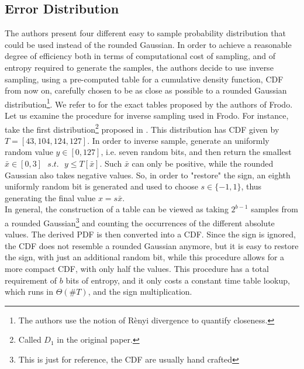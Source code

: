 \subsection{Error Distribution}
The authors present four different easy to sample probability distribution that could be used instead of the rounded Gaussian. In order to achieve a reasonable degree of efficiency both in terms of computational cost of sampling, and of entropy required to generate the samples, the authors decide to use inverse sampling, using a pre-computed table for a cumulative density function, CDF from now on, carefully chosen to be as close as possible to a rounded Gaussian distribution\footnote{The authors use the notion of R\`enyi divergence to quantify closeness.}. We refer to \cite{frodo} for the exact tables proposed by the authors of Frodo.\\
Let us examine the procedure for inverse sampling used in Frodo. For instance, take the first distribution\footnote{Called $D_1$ in the original paper.} proposed in \cite{frodo}. This distribution has CDF given by $T=[43,104,124,127]$. In order to inverse sample, generate an uniformly random value $y\in[0,127]$, i.e. seven random bits, and then return the smallest $\bar{x} \in [0,3]\text{ }s.t.\text{ }y\le T[\bar{x}]$. Such $\bar{x}$ can only be positive, while the rounded Gaussian also takes negative values. So, in order to "restore" the sign, an eighth uniformly random bit is generated and used to choose $s\in\{-1,1\}$, thus generating the final value $x=s\bar{x}$.\\
In general, the construction of a table can be viewed as taking $2^{b-1}$ samples from a rounded Gaussian\footnote{This is just for reference, the CDF are usually hand crafted} and counting the occurrences of the different absolute values. The derived PDF is then converted into a CDF. Since the sign is ignored, the CDF does not resemble a rounded Gaussian anymore, but it is easy to restore the sign, with just an additional random bit, while this procedure allows for a more compact CDF, with only half the values. This procedure has a total requirement of $b$ bits of entropy, and it only costs a constant time table lookup, which runs in $\Theta(\#T)$, and the sign multiplication.\\ 

